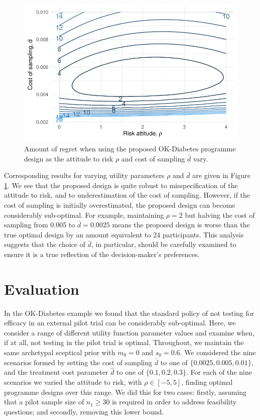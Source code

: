\documentclass[sagev, Crown]{sagej} %
\begin{document}
\begin{figure}
\centering
\includegraphics[scale=0.8]{./figures/sens_u.pdf}
\caption{Amount of regret when using the proposed OK-Diabetes programme design as the attitude to risk $\rho$ and cost of sampling $\bar{d}$ vary.}
\label{fig:sens_u}
\end{figure}

Corresponding results for varying utility parameters $\rho$ and $\bar{d}$ are given in Figure \ref{fig:sens_u}. We see that the proposed design is quite robust to misspecification of the attitude to risk, and to underestimation of the cost of sampling. However, if the cost of sampling is initially overestimated, the proposed design can become considerably sub-optimal. For example, maintaining $\rho = 2$ but halving the cost of sampling from 0.005 to $\bar{d} = 0.0025$ means the proposed design is worse than the true optimal design by an amount equivalent to 24 participants. This analysis suggests that the choice of $\bar{d}$, in particular, should be carefully examined to ensure it is a true reflection of the decision-maker's preferences.

\section{Evaluation}\label{sec:evaluation}

In the OK-Diabetes example we found that the standard policy of not testing for efficacy in an external pilot trial can be considerably sub-optimal. Here, we consider a range of different utility function parameter values and examine when, if at all, not testing in the pilot trial is optimal. Throughout, we maintain the same archetypal sceptical prior with $m_0 = 0$ and $s_0 = 0.6$. We considered the nine scenarios formed by setting the cost of sampling $\bar{d}$ to one of $\{0.0025, 0.005, 0.01\}$, and the treatment cost parameter $\hat{d} $ to one of $\{0.1, 0.2, 0.3\}$. For each of the nine scenarios we varied the attitude to risk, with $\rho \in [-5, 5]$, finding optimal programme designs over this range. We did this for two cases: firstly, assuming that a pilot sample size of $n_1 \geq 30$ is required in order to address feasibility questions; and secondly, removing this lower bound.
\end{document}
